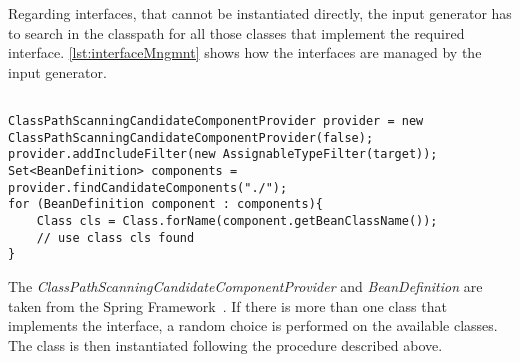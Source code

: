 
Regarding interfaces, that cannot be instantiated directly, the input generator has to search in the classpath for all those classes that implement the required interface. \autoref{lst:interfaceMngmnt} shows how the interfaces are managed by the input generator.

\begin{lstlisting}[caption={how to find a sub-class of an interface},label={lst:interfaceMngmnt}]% Start your code-block

ClassPathScanningCandidateComponentProvider provider = new ClassPathScanningCandidateComponentProvider(false);
provider.addIncludeFilter(new AssignableTypeFilter(target));
Set<BeanDefinition> components = provider.findCandidateComponents("./");
for (BeanDefinition component : components){
	Class cls = Class.forName(component.getBeanClassName());
	// use class cls found
}
\end{lstlisting}
The \textit{ClassPathScanningCandidateComponentProvider} and \textit{BeanDefinition} are taken from the Spring Framework~\cite{springFramework}.
If there is more than one class that implements the interface, a random choice is performed on the available classes. The class is then instantiated following the procedure described above.


